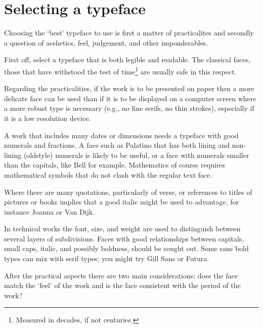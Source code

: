 \documentclass[10pt,letterpaper,extrafontsizes]{memoir}
\newcommand{\PWnote}[2]{}
\begin{document}
\PWnote{2009/04/26}{Added section on selecting a typeface}
\section{Selecting a typeface}

    Choosing the `best' typeface to use is first a matter of practicalites
and secondly a question of aeshetics, feel, judgement, and other 
imponderables.

    First off, 
select a typeface that is both legible and readable.
The classical faces, those that have withstood the test of 
time\footnote{Measured in decades, if not centuries.} are
usually safe in this respect.

   Regarding the practicalities, 
if the work is to be presented on paper then
a more delicate face can be used than if it is to be displayed on a computer
screen where a more robust type is necessary (e.g., no fine serifs, no 
thin strokes), especially if it is a low resolution device.

  A work that includes many dates or dimensions needs a typeface with good
numerals and fractions. A face such as Palatino
 that has both lining and non-lining (oldstyle)
numerals is likely to be useful, or a face with numerals smaller than the
capitals, like Bell for example. Mathematics of course requires mathematical
symbols that do not clash with the regular text face.

    Where there are many quotations, particularly of verse, or references 
to titles of pictures or books implies that a good italic might be used
to advantage, for instance Joanna or 
Van Dijk.

    In technical works the font, size, and weight are used to distinguish 
between several layers of subdivisions. Faces with good relationships between
capitals, small caps, italic, and possibly boldness, should be sought out.  
Some sans bold types can mix with serif types; you might try 
Gill Sans or Futura.



    After the practical aspects there are two main considerations: 
does the face match the `feel' of the work and is the face consistent 
with the period of the 
work? 
\end{document}
